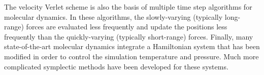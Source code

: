 The velocity Verlet scheme is also the basis of multiple time
step algorithms for molecular dynamics.  In these algorithms, the
slowly-varying (typically long-range) forces are evaluated less frequently
and update the positions less frequently than the quickly-varying
(typically short-range) forces.  Finally, many state-of-the-art molecular
dynamics integrate a Hamiltonian system that has been modified
in order to control the simulation temperature and pressure.  Much more
complicated symplectic methods have been developed for these systems.

